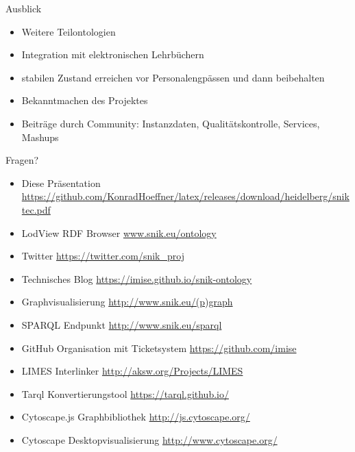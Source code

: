 \documentclass{beamer}
\begin{document}
\begin{frame}{Ausblick}
\begin{itemize}
\item Weitere Teilontologien 
\item Integration mit elektronischen Lehrbüchern
\item stabilen Zustand erreichen vor Personalengpässen und dann beibehalten
\item Bekanntmachen des Projektes
\item Beiträge durch Community: Instanzdaten, Qualitätskontrolle, Services, Mashups 
\end{itemize}
\end{frame}

\begin{frame}[fragile]{Fragen?}
\begin{itemize}
\item Diese Präsentation \url{https://github.com/KonradHoeffner/latex/releases/download/heidelberg/sniktec.pdf}
\item LodView RDF Browser \url{www.snik.eu/ontology}
\item Twitter \url{https://twitter.com/snik\_proj}
\item Technisches Blog \url{https://imise.github.io/snik-ontology}
\item Graphvisualisierung \url{http://www.snik.eu/(p)graph}
\item SPARQL Endpunkt \url{http://www.snik.eu/sparql}
\item GitHub Organisation mit Ticketsystem \url{https://github.com/imise}
\item LIMES Interlinker \url{http://aksw.org/Projects/LIMES}
\item Tarql Konvertierungstool \url{https://tarql.github.io/}
\item Cytoscape.js Graphbibliothek \url{http://js.cytoscape.org/}
\item Cytoscape Desktopvisualisierung \url{http://www.cytoscape.org/}
\end{itemize}
\end{frame}
 
\end{document}
